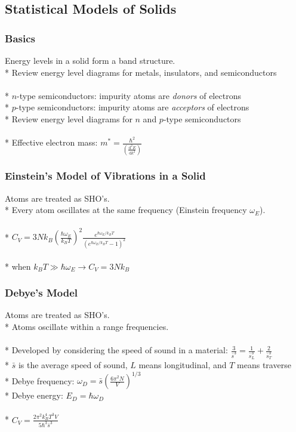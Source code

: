 \subsection{Statistical Models of Solids}

\subsubsection{Basics}
Energy levels in a solid form a band structure.\\*
Review energy level diagrams for metals, insulators, and semiconductors\\\\*
\(n\)-type semiconductors: impurity atoms are \emph{donors} of electrons\\*
\(p\)-type semiconductors: impurity atoms are \emph{acceptors} of electrons\\*
Review energy level diagrams for \(n\) and \(p\)-type semiconductors\\\\*
Effective electron mass: \(\displaystyle m^*=\frac{\hbar^2}{\left(\frac{\mathrm{d}^2E}{\mathrm{d}k^2}\right)}\)

\subsubsection{Einstein's Model of Vibrations in a Solid}
Atoms are treated as SHO's.\\*
Every atom oscillates at the same frequency (Einstein frequency \(\omega_E\)).\\\\*
\(\displaystyle C_V=3Nk_B\left(\frac{\hbar\omega_E}{k_BT}\right)^2\frac{e^{\hbar\omega_E/k_BT}}{\left(e^{\hbar\omega_E/k_BT}-1\right)^2}\)\\\\*
when \(k_BT\gg\hbar\omega_E\rightarrow C_V=3Nk_B\)

\subsubsection{Debye's Model}
Atoms are treated as SHO's.\\*
Atoms oscillate within a range frequencies.\\\\*
Developed by considering the speed of sound in a material: \(\displaystyle \frac{3}{\bar{s}^3}=\frac{1}{\bar{s}_L^3}+\frac{2}{\bar{s}_T^3}\)\\*
\(\bar{s}\) is the average speed of sound, \(L\) means longitudinal, and \(T\) means traverse\\*
Debye frequency: \(\displaystyle\omega_D=\bar{s}\left(\frac{6\pi^2N}{V}\right)^{1/3}\)\\*
Debye energy: \(E_D=\hbar\omega_D\)\\\\*
\(\displaystyle C_V=\frac{2\pi^2k_B^4T^3V}{5\hbar^3\bar{s}^3}\)
